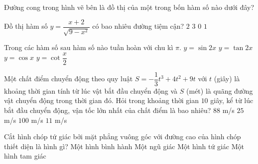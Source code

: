 \begin{ex}%
Đường cong trong hình vẽ bên là đồ thị của một trong bốn hàm số nào dưới đây?
\end{ex}

\begin{ex}%
Đồ thị hàm số $y=\dfrac{x+2}{\sqrt{9-x^2}}$ có bao nhiêu đường tiệm cận?
\choice
{\True $2$}
{$3$}
{$0$}
{$1$}
\end{ex}

\begin{ex}%
Trong các hàm số sau hàm số nào tuần hoàn với chu kì $\pi$.
\choice
{\True $y=\sin {2x}$}
{$y=\tan {2x}$}
{$y=\cos x$}
{$y=\cot \dfrac{x}{2}$}
\end{ex}
\begin{ex}%
Một chất điểm chuyển động theo quy luật $S=-\dfrac{1}{3}t^3 +4t^2 +9t$ với $t$ (giây) là khoảng thời gian tính từ lúc vật bắt đầu chuyển động và $S$ (mét) là quãng đường vật chuyển động trong thời gian đó. Hỏi trong khoảng thời gian $10$ giây, kể từ lúc bắt đầu chuyển động, vận tốc lớn nhất của chất điểm là bao nhiêu?
\choice
{$88$ m/s}
{\True $25$ m/s}
{$100$ m/s}
{$11$ m/s}

\end{ex}

\begin{ex}%
Cắt hình chóp tứ giác bởi mặt phẳng vuông góc với đường cao của hình chóp thiết diện là hình gì?
\choice
{Một hình bình hành}
{Một ngũ giác}
{\True Một hình tứ giác}
{Một hình tam giác}
\end{ex}

